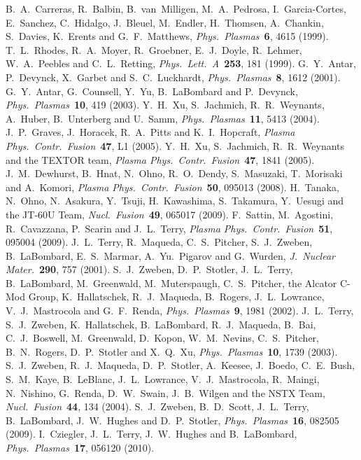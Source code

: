 \documentclass[aps,prb,12pt,a4paper,preprint,amsmath,amssymb,groupedaddress]{revtex4-1}
\newcommand{\JNM}{\textit{J.~Nuclear Mater.}}
\newcommand{\NF}{\textit{Nucl.\ Fusion}}
\newcommand{\PPCF}{\textit{Plasma Phys.\ Contr.\ Fusion}}
\newcommand{\PLA}{\textit{Phys.\ Lett.~A}}
\newcommand{\PP}{\textit{Phys.\ Plasmas}}
\begin{document}
\begin{thebibliography}{99}
%
B.~A.~Carreras, R.~Balbin, B.~van~{M}illigen, M.~A.~Pedrosa, I.~Garcia-Cortes, E.~Sanchez, C.~Hidalgo, J.~Bleuel, M.~Endler, H.~Thomsen, A.~Chankin, S.~Davies, K.~Erents and G.~F.~Matthews, \PP\ {\bf 6}, 4615 (1999).
%
T.~L.~Rhodes, R.~A.~Moyer, R.~Groebner, E.~J.~Doyle, R.~Lehmer, W.~A.~Peebles and C.~L.~Retting, \PLA\ {\bf 253}, 181 (1999).
%
G.~Y.~Antar, P.~Devynck, X.~Garbet and S.~C.~Luckhardt, \PP\ {\bf 8}, 1612 (2001).
%
G.~Y.~Antar, G.~Counsell, Y.~Yu, B.~La{B}ombard and P.~Devynck, \PP\ {\bf 10}, 419 (2003).
%
Y.~H.~Xu, S.~Jachmich, R.~R.~Weynants, A.~Huber, B.~Unterberg and U.~Samm, \PP\ {\bf 11}, 5413 (2004).
%
J.~P.~Graves, J.~Horacek, R.~A.~Pitts and K.~I.~Hopcraft, \PPCF\ {\bf 47}, L1 (2005).
%
Y.~H.~Xu, S.~Jachmich, R.~R.~Weynants and the TEXTOR team, \PPCF\ {\bf 47}, 1841 (2005).
%
%
J.~M.~Dewhurst, B.~Hnat, N.~Ohno, R.~O.~Dendy, S.~Masuzaki, T.~Morisaki and A.~Komori, \PPCF\ {\bf 50}, 095013 (2008).
%
H.~Tanaka, N.~Ohno, N.~Asakura, Y.~Tsuji, H.~Kawashima, S.~Takamura, Y.~Uesugi and the JT-60U Team, \NF\ {\bf 49}, 065017 (2009).
%
F.~Sattin, M.~Agostini, R.~Cavazzana, P.~Scarin and J.~L.~Terry, \PPCF\ {\bf 51}, 095004 (2009).
%
%
J.~L.~Terry, R.~Maqueda, C.~S.~Pitcher, S.~J.~Zweben, B.~La{B}ombard, E.~S.~Marmar, A.~Yu.~Pigarov and G.~Wurden, \JNM\ {\bf 290}, 757 (2001).
%
S.~J.~Zweben, D.~P.~Stotler, J.~L.~Terry, B.~La{B}ombard, M.~Greenwald, M.~Muterspaugh, C.~S.~Pitcher, the Alcator C-Mod Group, K.~Hallatschek, R.~J.~Maqueda, B.~Rogers, J.~L.~Lowrance, V.~J.~Mastrocola and G.~F.~Renda, \PP\ {\bf 9}, 1981 (2002).
%
J.~L.~Terry, S.~J.~Zweben, K.~Hallatschek, B.~La{B}ombard, R.~J.~Maqueda, B.~Bai, C.~J.~Boswell, M.~Greenwald, D.~Kopon, W.~M.~Nevins, C.~S.~Pitcher, B.~N.~Rogers, D.~P.~Stotler and X.~Q.~Xu, \PP\ {\bf 10}, 1739 (2003).
%
S.~J.~Zweben, R.~J.~Maqueda, D.~P.~Stotler, A.~Keesee, J.~Boedo, C.~E.~Bush, S.~M.~Kaye, B.~Le{B}lanc, J.~L.~Lowrance, V.~J.~Mastrocola, R.~Maingi, N.~Nishino, G.~Renda,
D.~W.~Swain, J.~B.~Wilgen and the NSTX Team, \NF\ {\bf 44}, 134 (2004).
%
S.~J.~Zweben, B.~D.~Scott, J.~L.~Terry, B.~La{B}ombard, J.~W.~Hughes and D.~P.~Stotler, \PP\ {\bf 16}, 082505 (2009).
%
I.~Cziegler, J.~L.~Terry, J.~W.~Hughes and B.~La{B}ombard, \PP\ {\bf 17}, 056120 (2010).

\end{thebibliography}
\end{document}
